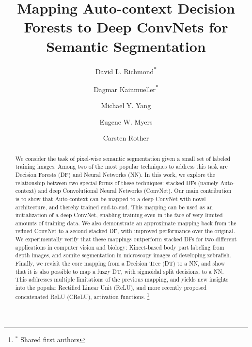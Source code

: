 \documentclass[twocolumn]{svjour3}
\newcommand\blfootnote[1]{%
  \begingroup
  \renewcommand\thefootnote{}\footnote{#1}%
  \addtocounter{footnote}{-1}%
  \endgroup
}
\begin{document}
\title{Mapping Auto-context Decision Forests to Deep ConvNets for Semantic Segmentation}


\author{David L. Richmond\textsuperscript{*} \and
	    Dagmar Kainmueller\textsuperscript{*} \and
		Michael Y. Yang \and
		Eugene W. Myers \and
		Carsten Rother
}



\date{}

\maketitle

\begin{abstract}
We consider the task of pixel-wise semantic segmentation given a small set of labeled training images.
Among two of the most popular techniques to address this task are Decision Forests (DF) and Neural Networks (NN).
In this work, we explore the relationship between two special forms of these techniques: stacked DFs (namely Auto-context) and deep Convolutional Neural Networks (ConvNet).
Our main contribution is to show that Auto-context can be mapped to a deep ConvNet with novel architecture, and thereby trained end-to-end.
This mapping can be used as an initialization of a deep ConvNet, enabling training even in the face of very limited amounts of training data.
We also demonstrate an approximate mapping back from the refined ConvNet to a second stacked DF, with improved performance over the original.
We experimentally verify that these mappings outperform stacked DFs for two different applications in computer vision and biology:  Kinect-based body part labeling from depth images, and somite segmentation in microscopy images of developing zebrafish.
Finally, we revisit the core mapping from a Decision Tree (DT) to a NN, and show that it is also possible to map a fuzzy DT, with sigmoidal split decisions, to a NN.
This addresses multiple limitations of the previous mapping, and yields new insights into the popular Rectified Linear Unit (ReLU), and more recently proposed concatenated ReLU (CReLU), activation functions.
\blfootnote{$^*$ Shared first authors}
\end{abstract}
\end{document}
